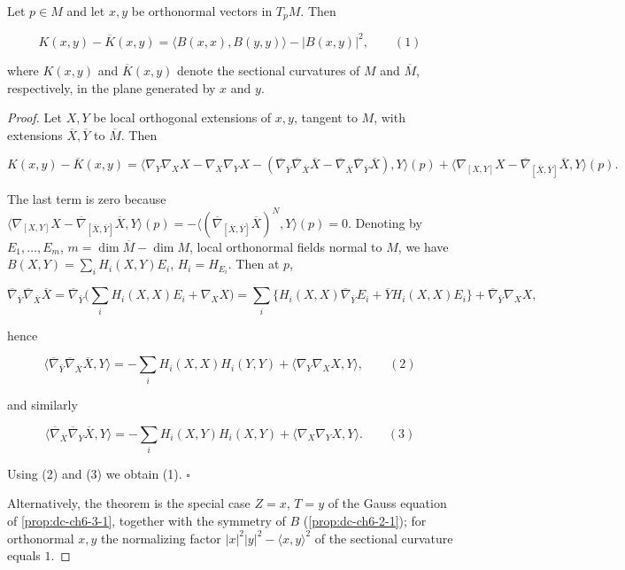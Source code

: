 \begin{theorem}[Gauss]
  \label{thm:dc-ch6-2-5}
  \leanok
  Let $p\in M$ and let $x,y$ be orthonormal vectors in $T_pM$. Then

  $$
  K(x,y)-\overline{K}(x,y)=\langle B(x,x),B(y,y)\rangle-|B(x,y)|^2,\qquad(1)
  $$

  where $K(x,y)$ and $\overline{K}(x,y)$ denote the sectional curvatures of $M$ and
  $\overline{M}$, respectively, in the plane generated by $x$ and $y$.
\end{theorem}
\begin{proof}
  \leanok
  Let $X,Y$ be local orthogonal extensions of $x,y$, tangent to $M$, with
  extensions $\overline{X},\overline{Y}$ to $\overline{M}$. Then
  
  $$
  K(x,y)-\overline{K}(x,y)=\langle\nabla_Y\nabla_X X-\nabla_X\nabla_Y X-(\overline{\nabla}_{\overline{Y}}\overline{\nabla}_{\overline{X}}\overline{X}-\overline{\nabla}_{\overline{X}}\overline{\nabla}_{\overline{Y}}\overline{X}),Y\rangle(p)+\langle\nabla_{[X,Y]}X-\overline{\nabla}_{[\overline{X},\overline{Y}]}\overline{X},Y\rangle(p).
  $$
  
  The last term is zero because
  $\langle\nabla_{[X,Y]}X-\overline{\nabla}_{[\overline{X},\overline{Y}]}\overline{X},Y\rangle(p)=-\langle(\overline{\nabla}_{[\overline{X},\overline{Y}]}\overline{X})^N,Y\rangle(p)=0$.
  Denoting by $E_1,\dots,E_m$, $m=\dim\overline{M}-\dim M$, local orthonormal fields
  normal to $M$, we have $B(X,Y)=\sum_i H_i(X,Y)E_i$, $H_i=H_{E_i}$. Then at $p$,
  
  $$
  \overline{\nabla}_{\overline{Y}}\overline{\nabla}_{\overline{X}}\overline{X}=\overline{\nabla}_{\overline{Y}}\Big(\sum_i H_i(X,X)E_i+\nabla_X X\Big)=\sum_i\{H_i(X,X)\overline{\nabla}_{\overline{Y}}E_i+\overline{Y}H_i(X,X)E_i\}+\overline{\nabla}_{\overline{Y}}\nabla_X X,
  $$
  
  hence
  
  $$
  \langle\overline{\nabla}_{\overline{Y}}\overline{\nabla}_{\overline{X}}\overline{X},Y\rangle=-\sum_i H_i(X,X)H_i(Y,Y)+\langle\nabla_Y\nabla_X X,Y\rangle,\qquad(2)
  $$
  
  and similarly
  
  $$
  \langle\overline{\nabla}_{\overline{X}}\overline{\nabla}_{\overline{Y}}\overline{X},Y\rangle=-\sum_i H_i(X,Y)H_i(X,Y)+\langle\nabla_X\nabla_Y X,Y\rangle.\qquad(3)
  $$
  
  Using (2) and (3) we obtain (1). $\square$

  Alternatively, the theorem is the special case $Z=x$, $T=y$ of the Gauss
  equation of \cref{prop:dc-ch6-3-1}, together with the symmetry of $B$
  (\cref{prop:dc-ch6-2-1}); for orthonormal $x,y$ the normalizing factor
  $|x|^2|y|^2-\langle x,y\rangle^2$ of the sectional curvature equals $1$.
\end{proof}

